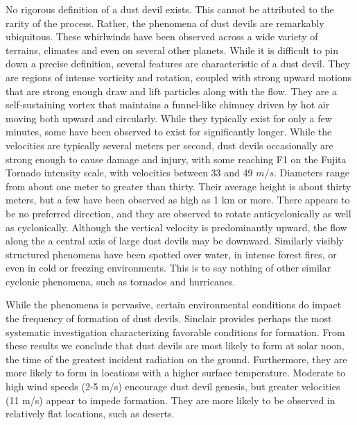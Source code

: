No rigorous definition of a dust devil exists. This cannot be attributed
to the rarity of the process. Rather, the phenomena of dust devils are
remarkably ubiquitous. These whirlwinds have been
observed across a wide variety of terrains, climates and even on several
other planets\cite{Sinclair1969,Bluestein2004,JGR:JGR13978,JGRE:JGRE1660}. 
While it is difficult to pin down a precise definition, several features 
are characteristic of a dust devil. They are regions of
intense vorticity and rotation, coupled with strong upward motions 
that are strong enough draw and lift particles along with the flow.
They are a self-sustaining vortex that maintains a funnel-like
chimney driven by hot air moving both upward and circularly. 
While they typically exist for only a few minutes, some have 
been observed to exist for significantly longer. While the velocities are 
typically several meters per second, 
%
%
dust devils occasionally are strong enough to cause damage and injury,
with some reaching F1 on the Fujita Tornado intensity
scale\cite{Edwards_tornadointensity}, with velocities between 33 and 49
$m/s$. 
%
%
Diameters range from about one meter to greater than thirty.  Their
average height is about thirty meters, but a few have been observed 
as high as 1 km or more. There appears to be no preferred direction, and
they are observed to rotate anticyclonically as well as
cyclonically. Although the vertical velocity 
is predominantly upward, the flow along the a central axis of large dust
devils may be downward. 
%
%
Similarly visibly structured phenomena have been spotted over water, in
intense forest fires, or even in cold or freezing environments. 
%
%
This is to say nothing of other similar cyclonic phenomena, such as
tornados and hurricanes. 

While the phenomena is pervasive, certain 
environmental conditions do impact the frequency of formation
of dust devils. Sinclair\cite{Sinclair1969} provides perhaps the most 
systematic investigation characterizing favorable conditions for
formation. From these results we conclude that dust devils are most
likely to form at solar noon, the time of the greatest incident radiation 
on the ground. Furthermore, they are more likely to form in locations 
with a higher surface temperature. Moderate to high wind speeds (2-5
m/s) encourage dust devil genesis, but greater velocities (11 m/s)
appear to impede formation. They are more likely to be observed in
relatively flat locations, such as deserts.  

